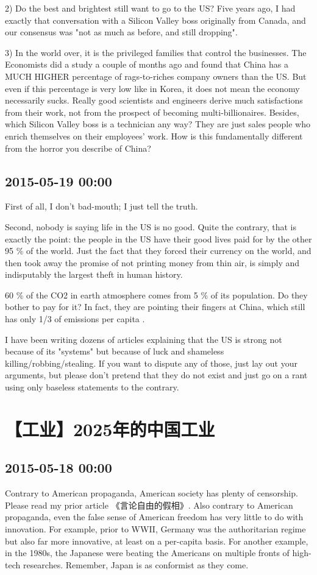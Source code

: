 \documentclass[twocolumn]{ctexart}
\begin{document}
2) Do the best and brightest still want to go to the US? Five years ago, I had exactly that conversation with a Silicon Valley boss originally from Canada, and our consensus was "not as much as before, and still dropping".

3) In the world over, it is the privileged families that control the businesses. The Economists did a study a couple of months ago and found that China has a MUCH HIGHER percentage of rags-to-riches company owners than the US. But even if this percentage is very low like in Korea, it does not mean the economy necessarily sucks. Really good scientists and engineers derive much satisfactions from their work, not from the prospect of becoming multi-billionaires. Besides, which Silicon Valley boss is a technician any way? They are just sales people who enrich themselves on their employees' work. How is this fundamentally different from the horror you describe of China?\subsection*{2015-05-19 00:00}
First of all, I don't bad-mouth; I just tell the truth.

Second, nobody is saying life in the US is no good. Quite the contrary, that is exactly the point: the people in the US have their good lives paid for by the other 95 \%  of the world. Just the fact that they forced their currency on the world, and then took away the promise of not printing money from thin air, is simply and indisputably the largest theft in human history. 

60 \%  of the CO2 in earth atmosphere comes from 5 \%  of its population. Do they bother to pay for it? In fact, they are pointing their fingers at China, which still has only 1/3 of emissions per capita .

I have been writing dozens of articles explaining that the US is strong not because of its "systems" but because of luck and shameless killing/robbing/stealing. If you want to dispute any of those, just lay out your arguments, but please don't pretend that they do not exist and just go on a rant using only baseless statements to the contrary.\section*{【工业】2025年的中国工业}
\subsection*{2015-05-18 00:00}
Contrary to American propaganda, American society has plenty of censorship. Please read my prior article 《言论自由的假相》. Also contrary to American propaganda, even the false sense of American freedom has very little to do with innovation. For example, prior to WWII, Germany was the authoritarian regime but also far more innovative, at least on a per-capita basis. For another example, in the 1980s, the Japanese were beating the Americans on multiple fronts of high-tech researches. Remember, Japan is as conformist as they come.
\end{document}

